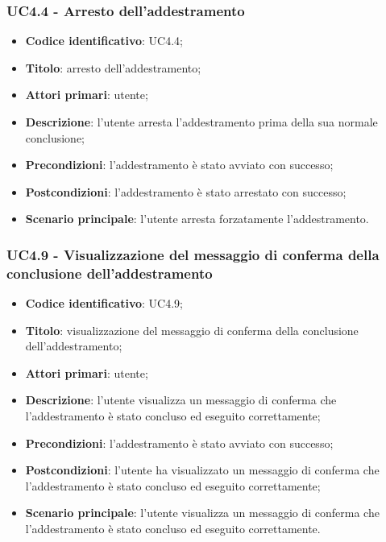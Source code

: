 \subsubsection{UC4.4 - Arresto dell'addestramento}
\begin{itemize}
	\item \textbf{Codice identificativo}: UC4.4;
	\item \textbf{Titolo}: arresto dell'addestramento;
	\item \textbf{Attori primari}: utente;
	\item \textbf{Descrizione}: l'utente arresta l'addestramento prima della sua normale conclusione;
	\item \textbf{Precondizioni}: l'addestramento è stato avviato con successo;
	\item \textbf{Postcondizioni}: l'addestramento è stato arrestato con successo;
	\item \textbf{Scenario principale}: l'utente arresta forzatamente l'addestramento.
\end{itemize}

\subsubsection{UC4.9 - Visualizzazione del messaggio di conferma della conclusione dell'addestramento}
\begin{itemize}
	\item \textbf{Codice identificativo}: UC4.9;
	\item \textbf{Titolo}: visualizzazione del messaggio di conferma della conclusione dell'addestramento;
	\item \textbf{Attori primari}: utente;
	\item \textbf{Descrizione}: l'utente visualizza un messaggio di conferma che l'addestramento è stato concluso ed eseguito correttamente;
	\item \textbf{Precondizioni}: l'addestramento è stato avviato con successo;
	\item \textbf{Postcondizioni}: l'utente ha visualizzato un messaggio di conferma che l'addestramento è stato concluso ed eseguito correttamente;
	\item \textbf{Scenario principale}: l'utente visualizza un messaggio di conferma che l'addestramento è stato concluso ed eseguito correttamente.
\end{itemize}

